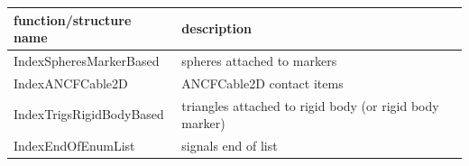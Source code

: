 \begin{center}
\footnotesize
\begin{longtable}{| p{8cm} | p{8cm} |} 
\hline
{\bf function/structure name} & {\bf description}\\ \hline
  IndexSpheresMarkerBased & spheres attached to markers\\ \hline  
  IndexANCFCable2D & ANCFCable2D contact items\\ \hline  
  IndexTrigsRigidBodyBased & triangles attached to rigid body (or rigid body marker)\\ \hline  
  IndexEndOfEnumList & signals end of list\\ \hline  
\end{longtable}
\end{center}
